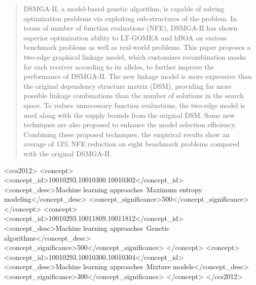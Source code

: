 \documentclass{sig-alternate-05-2015}
\begin{document}
\maketitle
\begin{abstract}
DSMGA-II, a model-based genetic algorithm, is capable of solving optimization problems via exploiting sub-structures of the problem. In terms of number of function evaluations (NFE), DSMGA-II has shown superior optimization ability to LT-GOMEA and hBOA on various benchmark problems as well as real-world problems. This paper proposes a two-edge graphical linkage model, which customizes recombination masks for each receiver according to its alleles, to further improve the performance of DSMGA-II.  The new linkage model is more expressive than the original dependency structure matrix (DSM), providing far more possible linkage combinations than the number of solutions in the search space. To reduce unnecessary function evaluations, the two-edge model is used along with the supply bounds from the original DSM. Some new techniques are also proposed to enhance the model selection efficiency. Combining these proposed techniques, the empirical results show an average of 13\% NFE reduction on eight benchmark problems compared with the original DSMGA-II.
\end{abstract}


%
%
\begin{CCSXML}
<ccs2012>
<concept>
<concept_id>10010293.10010300.10010302</concept_id>
<concept_desc>Machine learning approaches~Maximum entropy modeling</concept_desc>
<concept_significance>500</concept_significance>
</concept>
<concept>
<concept_id>10010293.10011809.10011812</concept_id>
<concept_desc>Machine learning approaches~Genetic algorithms</concept_desc>
<concept_significance>500</concept_significance>
</concept>
<concept>
<concept_id>10010293.10010300.10010304</concept_id>
<concept_desc>Machine learning approaches~Mixture models</concept_desc>
<concept_significance>300</concept_significance>
</concept>
</ccs2012>
\end{CCSXML}

%
%

%
%
\printccsdesc
\end{document}
